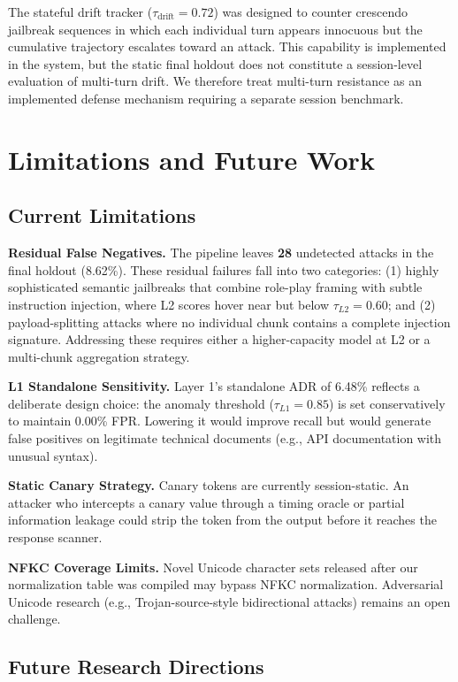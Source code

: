 \documentclass[conference]{IEEEtran}
\begin{document}
The stateful drift tracker ($\tau_{\text{drift}} = 0.72$) was designed to counter crescendo jailbreak sequences in which each individual turn appears innocuous but the cumulative trajectory escalates toward an attack. This capability is implemented in the system, but the static final holdout does not constitute a session-level evaluation of multi-turn drift. We therefore treat multi-turn resistance as an implemented defense mechanism requiring a separate session benchmark.



\section{Limitations and Future Work}

\subsection{Current Limitations}

\textbf{Residual False Negatives.} The pipeline leaves \textbf{28} undetected attacks in the final holdout (8.62\%). These residual failures fall into two categories: (1) highly sophisticated semantic jailbreaks that combine role-play framing with subtle instruction injection, where L2 scores hover near but below $\tau_{L2} = 0.60$; and (2) payload-splitting attacks where no individual chunk contains a complete injection signature. Addressing these requires either a higher-capacity model at L2 or a multi-chunk aggregation strategy.


\textbf{L1 Standalone Sensitivity.} Layer 1's standalone ADR of 6.48\% reflects a deliberate design choice: the anomaly threshold ($\tau_{L1} = 0.85$) is set conservatively to maintain 0.00\% FPR. Lowering it would improve recall but would generate false positives on legitimate technical documents (e.g., API documentation with unusual syntax).


\textbf{Static Canary Strategy.} Canary tokens are currently session-static. An attacker who intercepts a canary value through a timing oracle or partial information leakage could strip the token from the output before it reaches the response scanner.


\textbf{NFKC Coverage Limits.} Novel Unicode character sets released after our normalization table was compiled may bypass NFKC normalization. Adversarial Unicode research (e.g., Trojan-source-style bidirectional attacks) remains an open challenge.


\subsection{Future Research Directions}
\end{document}
